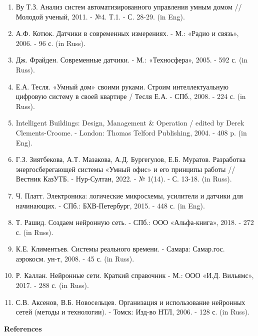 \begin{enumerate}
\item
Ву Т.З. Анализ систем автоматизированного управления умным домом //
Молодой ученый, 2011. - №4. Т.1. - С. 28-29. (in Eng).

\item
А.Ф. Котюк. Датчики в современных измерениях. - М.: «Радио и связь»,
2006. - 96 с. (in Russ).

\item
Дж. Фрайден. Современные датчики. - М.: «Техносфера», 2005. - 592
с. (in Russ).

\item
Е.А. Тесля. «Умный дом» своими руками. Строим интеллектуальную
цифровую систему в своей квартире / Тесля Е.А. - СПб., 2008. - 224 с.
(in Russ).

\item
Intelligent Buildings: Design, Management \& Operation / edited by
Derek Clements-Croome. - London: Thomas Telford Publishing, 2004. -
408 p. (in Eng).

\item
Г.З. Зиятбекова, А.Т. Мазакова, А.Д. Бургегулов, Е.Б. Муратов.
Разработка энергосберегающей системы «Умный офис» и его принципы работы
// Вестник КазУТБ. - Нур-Султан, 2022. - № 1(14). - С. 13-18. (in
Russ).

\item
Ч. Платт. Электроника: логические микросхемы, усилители и датчики для
начинающих. - СПб.: БХВ-Петербург, 2015. - 448 с. (in Eng).

\item
Т. Рашид. Создаем нейронную сеть. - СПб.: ООО «Альфа-книга», 2018.
- 272 с. (in Russ).

\item
К.Е. Климентьев. Системы реального времени. - Самара: Самар.гос.
аэрокосм. ун-т, 2008. - 45 с. (in Russ).

\item
Р. Каллан. Нейронные сети. Краткий справочник - М.: ООО «И.Д.
Вильямс», 2017. - 288 с. (in Russ).

\item
С.В. Аксенов, В.Б. Новосельцев. Организация и использование
нейронных сетей (методы и технологии). - Томск: Изд-во НТЛ, 2006. -
128 с. (in Russ).
\end{enumerate}

\begin{center}
{\bfseries References}
\end{center}

